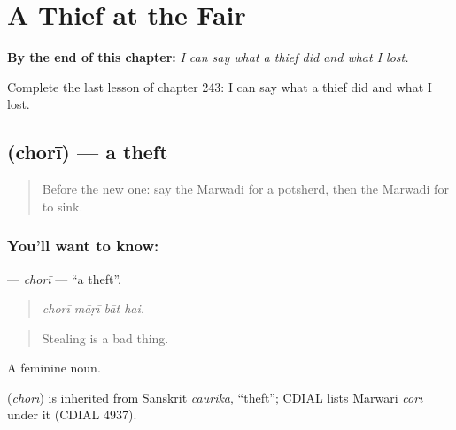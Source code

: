 
\chapter{A Thief at the Fair}
\label{ch:mw-a-thief-at-the-fair}

\begin{chapteropening}
\textbf{By the end of this chapter:} \emph{I can say what a thief did and what I lost.}

Complete the last lesson of chapter 243: I can say what a thief did and what I lost.
\end{chapteropening}

\section[\texorpdfstring{\mw{चोरी} (chorī)}{चोरी (chorī)}]{ (chorī) — a theft}

\label{lesson:MW-C243-chori}



\begin{quote}
Before the new one: say the Marwadi for a potsherd, then the Marwadi for to sink.
\end{quote}

\subsection*{You'll want to know: }
\textbf{} — \emph{chorī} — \textquotedblleft{}a theft\textquotedblright{}.

\begin{quote}
   
\end{quote}

\begin{quote}
\emph{chorī māṛī bāt hai.}
\end{quote}

\begin{quote}
Stealing is a bad thing.
\end{quote}

A feminine noun.

\begin{cousinweb}
\textbf{} (\emph{chorī}) is inherited from Sanskrit \emph{caurikā}, \textquotedblleft{}theft\textquotedblright{}; CDIAL lists Marwari \emph{corī} under it (CDIAL 4937).
\end{cousinweb}

